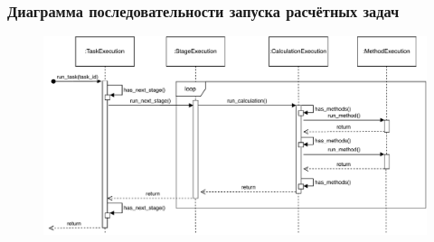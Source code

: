 \begin{frame}
\frametitle{Диаграмма последовательности запуска расчётных задач}
\begin{figure}
    \includegraphics[scale=.7]{pictures/architecture/orchestrator_sequence}
\end{figure}
\end{frame}
